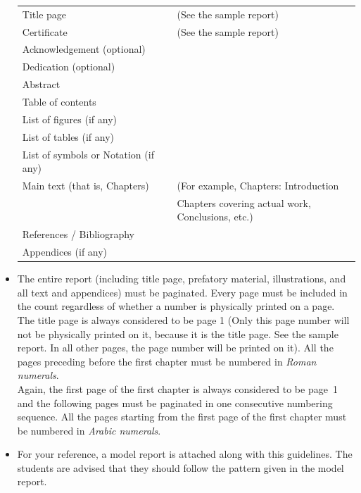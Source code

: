 \documentclass[12pt, a4paper]{article}
\begin{document}
\begin{itemize}
{     %
       \begin{tabular}{lcl}
         Title page & &(See the sample report)\\
         Certificate & & (See the sample report) \\
         Acknowledgement (optional)  & & \\
         Dedication (optional) & & \\
         Abstract & & \\
         Table of contents & & \\
         List of figures  (if any) & & \\
         List of tables (if any) & & \\
         List of symbols or Notation (if any) & & \\
         Main text (that is, Chapters) & & (For example, Chapters: Introduction \\
         & & \hspace{-1.3cm} Chapters covering actual work, Conclusions, etc.) \\
         References / Bibliography  & & \\
         Appendices (if any)& & \\
       \end{tabular}
}
\item{
     The entire report (including title page, prefatory material, illustrations,
     and all text and appendices) must be paginated. Every page must be included
     in the count regardless of whether a number is physically printed on a
     page.\\
     The title page is always considered to be page 1 (Only this  page number
     will not  be physically printed on it, because it is the title page. See the
     sample report. In all other pages, the page number will
     be printed on it).
     All the pages preceding before the first chapter must be numbered in {\em Roman
        numerals}.\\
     Again, the first page of the first chapter is  always considered to be page~1
     and  the following pages must be paginated in one consecutive
     numbering sequence.
     All the pages starting from the first page of the first chapter
     must be numbered in {\em Arabic numerals}.}

\item For your reference, a model report is attached along with this guidelines.
  The students are advised that they should follow the pattern given in the model report.


\end{itemize}
\end{document}
